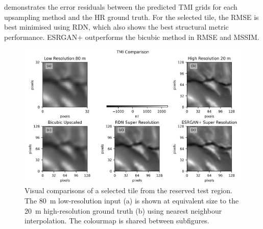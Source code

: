  demonstrates the error residuals between the predicted TMI grids for each upsampling method and the HR ground truth.
For the selected tile, the RMSE is best minimised using RDN\textdaggerdbl{}, which also shows the best structural metric performance.
ESRGAN+ outperforms the bicubic method in RMSE and MSSIM\@.

\begin{landscape}
    \begin{figure}[hbtp]
        \centering
        \includegraphics[width=\linewidth,trim={0 0 0 5mm},clip]{fig/p1/resultsvis.png}
        \caption[Visual inference results]{Visual comparisons of a selected tile from the reserved test region.
            The \qty{80}{\metre} low-resolution input (a) is shown at equivalent size to the \qty{20}{\metre} high-resolution ground truth (b) using nearest neighbour interpolation.
            The colourmap is shared between subfigures.
        }
        \label{fig:resultsvis}
    \end{figure}
\end{landscape}

